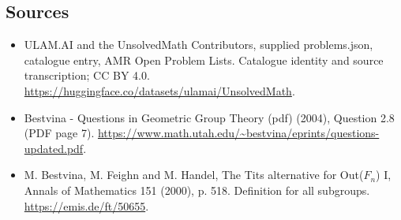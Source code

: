 \documentclass[11pt,a4paper]{article}
\begin{document}
\subsection{Sources}
\begin{itemize}
\item[S1] ULAM.AI and the UnsolvedMath Contributors, supplied problems.json, catalogue entry, AMR Open Problem Lists. Catalogue identity and source transcription; CC BY 4.0.
\url{https://huggingface.co/datasets/ulamai/UnsolvedMath}.
\item[S2] Bestvina - Questions in Geometric Group Theory (pdf) (2004), Question 2.8 (PDF page 7). 
\url{https://www.math.utah.edu/~bestvina/eprints/questions-updated.pdf}.
\item[S3] M. Bestvina, M. Feighn and M. Handel, The Tits alternative for Out($F_n$) I, Annals of Mathematics 151 (2000), p. 518. Definition for all subgroups.
\url{https://emis.de/ft/50655}.
\end{itemize}
\end{document}
